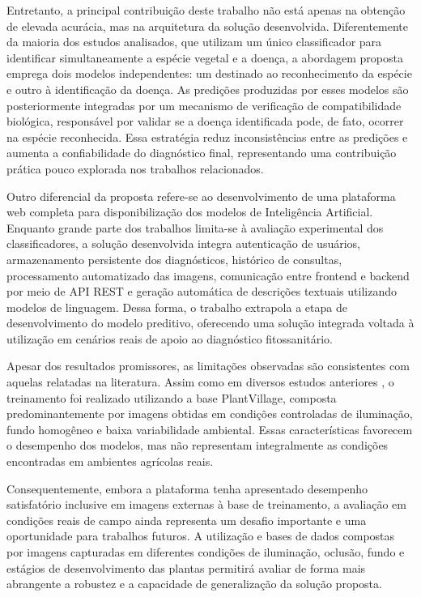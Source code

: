\documentclass[portuguese]{sbc2025}%
\begin{document}
Entretanto, a principal contribuição deste trabalho não está apenas na obtenção de elevada acurácia, mas na arquitetura da solução 
desenvolvida. Diferentemente da maioria dos estudos analisados, que utilizam um único classificador para identificar simultaneamente 
a espécie vegetal e a doença, a abordagem proposta emprega dois modelos independentes: um destinado ao reconhecimento da espécie
e outro à identificação da doença. As predições produzidas por esses modelos são posteriormente integradas por um mecanismo de 
verificação de compatibilidade biológica, responsável por validar se a doença identificada pode, de fato, ocorrer na espécie 
reconhecida. Essa estratégia reduz inconsistências entre as predições e aumenta a confiabilidade do diagnóstico final, 
representando uma contribuição prática pouco explorada nos trabalhos relacionados.

Outro diferencial da proposta refere-se ao desenvolvimento de uma plataforma web completa para disponibilização dos modelos de 
Inteligência Artificial. Enquanto grande parte dos trabalhos limita-se à avaliação experimental dos classificadores, a solução 
desenvolvida integra autenticação de usuários, armazenamento persistente dos diagnósticos, histórico de consultas, processamento 
automatizado das imagens, comunicação entre frontend e backend por meio de API REST e geração automática de descrições textuais 
utilizando modelos de linguagem. Dessa forma, o trabalho extrapola a etapa de desenvolvimento do modelo preditivo, oferecendo 
uma solução integrada voltada à utilização em cenários reais de apoio ao diagnóstico fitossanitário.

Apesar dos resultados promissores, as limitações observadas são consistentes com aquelas relatadas na literatura. Assim como em 
diversos estudos anteriores \citep{ref1,ref2,ref3}, o treinamento foi realizado utilizando a base PlantVillage, composta 
predominantemente por imagens obtidas em condições controladas de iluminação, fundo homogêneo e baixa variabilidade ambiental. 
Essas características favorecem o desempenho dos modelos, mas não representam integralmente as condições encontradas em ambientes 
agrícolas reais.

Consequentemente, embora a plataforma tenha apresentado desempenho satisfatório inclusive em imagens externas à base de treinamento, 
a avaliação em condições reais de campo ainda representa um desafio importante e uma oportunidade para trabalhos futuros. A 
utilização e bases de dados compostas por imagens capturadas em diferentes condições de iluminação, oclusão, fundo e estágios de 
desenvolvimento das plantas permitirá avaliar de forma mais abrangente a robustez e a capacidade de generalização da solução proposta.
\end{document}
